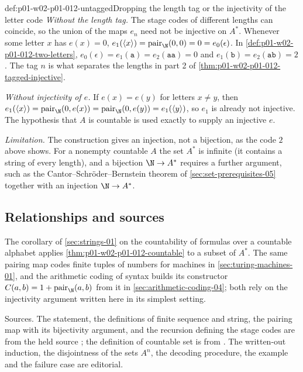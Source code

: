 \begin{hbwarning}{def:p01-w02-p01-012-untagged}{Dropping the length tag or the injectivity of the letter code}
\emph{Without the length tag.} The stage codes of different lengths can
coincide, so the union of the maps \(e_n\) need not be injective on \(A^*\).
Whenever some letter \(x\) has \(e(x)=0\),
\(e_1(\langle x\rangle)=\operatorname{pair}_{\N}(0,0)=0=e_0(\epsilon)\). In
\cref{def:p01-w02-p01-012-two-letters},
\(e_0(\epsilon)=e_1(\mathtt a)=e_2(\mathtt{aa})=0\) and
\(e_1(\mathtt b)=e_2(\mathtt{ab})=2\). The tag \(n\) is what separates the
lengths in part 2 of \cref{thm:p01-w02-p01-012-tagged-injective}.

\emph{Without injectivity of \(e\).} If \(e(x)=e(y)\) for letters \(x\neq y\),
then \(e_1(\langle x\rangle)=\operatorname{pair}_{\N}(0,e(x))
=\operatorname{pair}_{\N}(0,e(y))=e_1(\langle y\rangle)\), so \(e_1\) is
already not injective. The hypothesis that \(A\) is countable is used exactly
to supply an injective \(e\).

\emph{Limitation.} The construction gives an injection, not a bijection, as
the code \(2\) above shows. For a nonempty countable \(A\) the set \(A^*\) is
infinite (it contains a string of every length), and a bijection
\(\N\to A^*\) requires a further argument, such as the
Cantor--Schr\"oder--Bernstein theorem of \cref{sec:set-prerequisites-05}
together with an injection \(\N\to A^*\).
\end{hbwarning}

\subsection{Relationships and sources}
\label{sec:p01-w02-p01-012-relationships}

The corollary of \cref{sec:strings-01} on the countability of formulas over a
countable alphabet applies \cref{thm:p01-w02-p01-012-countable} to a subset of
\(A^*\). The same pairing map codes finite tuples of numbers for machines in
\cref{sec:turing-machines-01}, and the arithmetic coding of syntax builds its
constructor \(C(a,b)=1+\operatorname{pair}_{\N}(a,b)\) from it in
\cref{sec:arithmetic-coding-04}; both rely on the injectivity argument
written here in its simplest setting.

Sources. The statement, the definitions of finite sequence and string, the
pairing map with its bijectivity argument, and the recursion defining the
stage codes are from the held source \cite[ch.~``Finite Strings, Induction,
and Recursion'', sec.~``Finite sequences and strings'']{FrozenFormalLogicStringCoding};
the definition of countable set is from \cite[ch.~``Sets, Relations, Functions, and Cardinality'',
sec.~``Finite, countable, and uncountable sets'', definition ``Countable
set'']{FrozenFormalLogicStringCoding}. The written-out induction, the
disjointness of the sets \(A^n\), the decoding procedure, the example and the
failure case are editorial.
